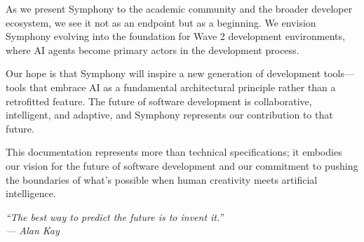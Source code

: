 As we present Symphony to the academic community and the broader developer ecosystem, we see it not as an endpoint but as a beginning. We envision Symphony evolving into the foundation for Wave 2 development environments, where AI agents become primary actors in the development process.

\begin{alertbox}
Our hope is that Symphony will inspire a new generation of development tools—tools that embrace AI as a fundamental architectural principle rather than a retrofitted feature. The future of software development is collaborative, intelligent, and adaptive, and Symphony represents our contribution to that future.
\end{alertbox}

This documentation represents more than technical specifications; it embodies our vision for the future of software development and our commitment to pushing the boundaries of what's possible when human creativity meets artificial intelligence.

\vspace{0.5cm}
\begin{center}
\textit{``The best way to predict the future is to invent it.''}\\
\textit{— Alan Kay}
\end{center}

\clearpage
